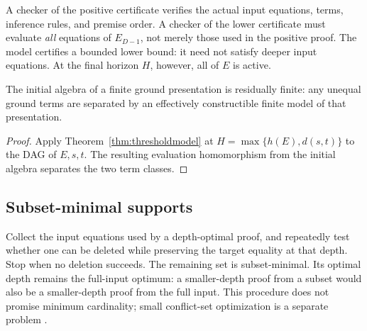 A checker of the positive certificate verifies the actual input equations, terms, inference rules, and premise order. A checker of the lower certificate must evaluate \emph{all} equations of $E_{D-1}$, not merely those used in the positive proof. The model certifies a bounded lower bound: it need not satisfy deeper input equations. At the final horizon $H$, however, all of $E$ is active.

\begin{corollary}\label{cor:resfinite}
The initial algebra of a finite ground presentation is residually finite: any unequal ground terms are separated by an effectively constructible finite model of that presentation.
\end{corollary}
\begin{proof}
Apply Theorem~\ref{thm:thresholdmodel} at $H=\max\{h(E),d(s,t)\}$ to the DAG of $E,s,t$. The resulting evaluation homomorphism from the initial algebra separates the two term classes.
\end{proof}

\subsection{Subset-minimal supports}
Collect the input equations used by a depth-optimal proof, and repeatedly test whether one can be deleted while preserving the target equality at that depth. Stop when no deletion succeeds. The remaining set is subset-minimal. Its optimal depth remains the full-input optimum: a smaller-depth proof from a subset would also be a smaller-depth proof from the full input. This procedure does not promise minimum cardinality; small conflict-set optimization is a separate problem \cite{FellnerFontainePaleo2017}.
